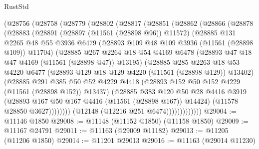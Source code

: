 \begin{lexlean}{RustStd}
\begin{coremodule}
        (@28756
          (@28758
            (@28779
              (@28802
                (@28817
                  (@28851
                    (@28862
                      (@28866
                        (@28878
                          (@28883
                            (@28891
                              (@28897 (@11561 (@28898 @96)) @11572)
                              (@28885
                                @131
                                @2265
                                @48
                                @55
                                @3936
                                @6479
                                (@28893 @109 @48 @109 @3936 (@11561 (@28898 @109)) @11704)
                                (@28885
                                  @267
                                  @2264
                                  @18
                                  @54
                                  @4169
                                  @6478
                                  (@28893 @47 @18 @47 @4169 (@11561 (@28898 @47)) @13195)
                                  (@28885
                                    @285
                                    @2263
                                    @18
                                    @53
                                    @4220
                                    @6477
                                    (@28893 @129 @18 @129 @4220 (@11561 (@28898 @129)) @13402)
                                    (@28885
                                      @291
                                      @385
                                      @50
                                      @52
                                      @4229
                                      @4418
                                      (@28893 @152 @50 @152 @4229 (@11561 (@28898 @152)) @13437)
                                      (@28885
                                        @383
                                        @120
                                        @50
                                        @28
                                        @4416
                                        @3919
                                        (@28893 @167 @50 @167 @4416 (@11561 (@28898 @167)) @14424)
                                        (@11578 @28850 @3627))))))))
                          (@12148 (@12216 @251 @6474)))))))))))))
@29004 := @11146 @1850
@29008 := @11148 (@11152 @1850) (@11158 @1850)
@29009 := @11167 @24791
@29011 := @11163 (@29009 @11182)
@29013 := @11205 (@11206 @1850)
@29014 := @11201 @29013
@29016 := @11163 (@29014 @11230)

\end{coremodule}
\end{lexlean}
